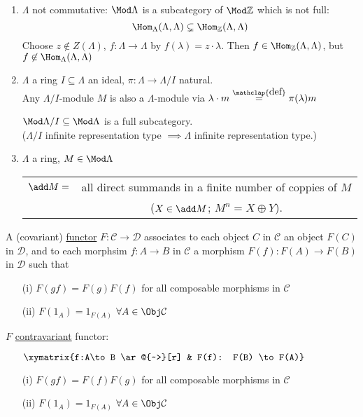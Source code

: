 \begin{exam}
\begin{enumerate}
\item $\Lambda$ not commutative: $\Mod \Lambda$ is a subcategory of $\Mod\mathbb{Z}$ which is not full: \[\Hom_\Lambda(\Lambda, \Lambda) \subsetneq \Hom_\mathbb{Z}(\Lambda, \Lambda)\]
Choose $z \not\in Z(\Lambda)$, $f: \Lambda \to \Lambda$ by $f(\lambda) = z\cdot \lambda$. Then $f \in \Hom_\mathbb{Z}(\Lambda, \Lambda)$, but $f \not\in \Hom_\Lambda(\Lambda,\Lambda)$ 

\item $\Lambda$ a ring $I \subseteq \Lambda$ an ideal, $\pi : \Lambda \to \Lambda/I$ natural.\\
Any $\Lambda/I$-module $M$ is also a $\Lambda$-module via $\lambda \cdot m \stackrel{\mathclap{\normalfont\mbox{def}}}{=} \pi(\lambda)m$
\begin{exer}
$\Mod \Lambda/I \subseteq \Mod \Lambda$ is a full subcategory.\\ ($\Lambda/I$ infinite representation type $\implies \Lambda$ infinite representation type.)
\end{exer}

\item $\Lambda$ a ring, $M \in \Mod\Lambda$\\
\begin{tabular}{cc}
$\add M = $ &all direct summands in a finite number of coppies of $M$\\&($X \in \add M$; $M^n = X \oplus Y$).
\end{tabular}
\end{enumerate}
\end{exam}

\begin{defin}
A (covariant) \underline{functor} $F: \mathcal{C} \to \mathcal{D}$ associates to each object $C$ in $\mathcal{C}$ an object $F(C)$ in $\mathcal{D}$, and to each morphsim $f:A\to B$ in $\mathcal{C}$ a morphism $F(f):F(A)\to F(B)$ in $\mathcal{D}$ such that
\begin{enumerate}
\item[(i)] $F(gf) = F(g)F(f)$ for all composable morphisms in $\mathcal{C}$
\item[(ii)] $F(1_A) = 1_{F(A)}$ $\forall A \in \Obj \mathcal{C}$
\end{enumerate}
$F$ \underline{contravariant} functor:
\begin{enumerate}
\item[] $\xymatrix{f:A\to B \ar@{~>}[r] & F(f): F(B) \to F(A)}$
\item[(i)] $F(gf) = F(f)F(g)$ for all composable morphisms in $\mathcal{C}$
\item[(ii)] $F(1_A) = 1_{F(A)}$ $\forall A \in \Obj \mathcal{C}$
\end{enumerate}
\end{defin}

